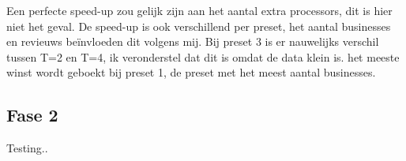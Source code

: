\documentclass[]{article}
\begin{document}
Een perfecte speed-up zou gelijk zijn aan het aantal extra processors, dit is hier niet het geval.
De speed-up is ook verschillend per preset, het aantal businesses en revieuws beïnvloeden dit volgens mij.
Bij preset 3 is er nauwelijks verschil tussen T=2 en T=4, ik veronderstel dat dit is omdat de data klein is.
het meeste winst wordt geboekt bij preset 1, de preset met het meest aantal businesses.

\subsection{Fase 2}

Testing..
\end{document}
